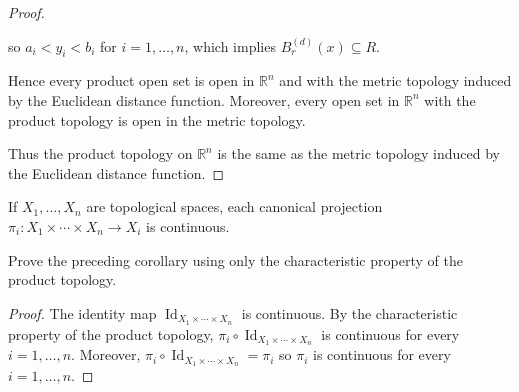 \begin{proof}
\begin{itemize}
		      so $a_{i} < y_{i} < b_{i}$ for $i = 1,\ldots, n$, which implies $B^{(d)}_{r}(x)\subseteq R$.

		      Hence every product open set is open in $\mathbb{R}^{n}$ and with the metric topology induced by the Euclidean distance function. Moreover, every open set in $\mathbb{R}^{n}$ with the product topology is open in the metric topology.
	\end{itemize}

	Thus the product topology on $\mathbb{R}^{n}$ is the same as the metric topology induced by the Euclidean distance function.
\end{proof}

\begin{exercise}{3.29}
	If $X_{1}, \ldots, X_{n}$ are topological spaces, each canonical projection $\pi_{i}: X_{1}\times\cdots\times X_{n}\to X_{i}$ is continuous.

	Prove the preceding corollary using only the characteristic property of the product topology.
\end{exercise}

\begin{proof}
	The identity map $\operatorname{Id}_{X_{1}\times\cdots\times X_{n}}$ is continuous. By the characteristic property of the product topology, $\pi_{i}\circ \operatorname{Id}_{X_{1}\times\cdots\times X_{n}}$ is continuous for every $i = 1,\ldots, n$. Moreover, $\pi_{i}\circ \operatorname{Id}_{X_{1}\times\cdots\times X_{n}} = \pi_{i}$ so $\pi_{i}$ is continuous for every $i = 1,\ldots,n$.
\end{proof}

